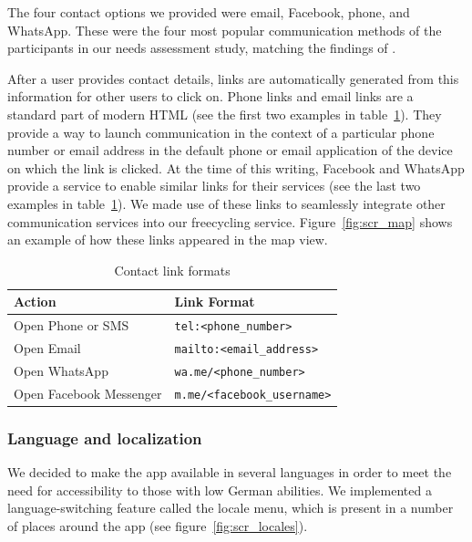 The four contact options we provided were email, Facebook, phone, and WhatsApp. These were the four most popular communication methods of the participants in our needs assessment study, matching the findings of .

After a user provides contact details, links are automatically generated from this information for other users to click on. Phone links and email links are a standard part of modern HTML (see the first two examples in table~\ref{tab:contact_link_examples}). They provide a way to launch communication in the context of a particular phone number or email address in the default phone or email application of the device on which the link is clicked. At the time of this writing, Facebook and WhatsApp provide a service to enable similar links for their services (see the last two examples in table~\ref{tab:contact_link_examples}). We made use of these links to seamlessly integrate other communication services into our freecycling service. Figure~\ref{fig:scr_map} shows an example of how these links appeared in the map view.

\begin{table}[ht]
\centering
\begin{tabular}{|l|l|}
\hline
\rowcolor{lightgray}
\textbf{Action}         & \textbf{Link Format}                                      \\ \hline
Open Phone or SMS       & \texttt{tel:\textless{}phone\_number\textgreater{}}       \\ \hline
Open Email              & \texttt{mailto:\textless{}email\_address\textgreater{}}   \\ \hline
Open WhatsApp           & \texttt{wa.me/\textless{}phone\_number\textgreater{}}     \\ \hline
Open Facebook Messenger & \texttt{m.me/\textless{}facebook\_username\textgreater{}} \\ \hline
\end{tabular}
\caption{Contact link formats}
\label{tab:contact_link_examples}
\end{table}


\subsubsection*{Language and localization}

We decided to make the app available in several languages in order to meet the need for accessibility to those with low German abilities. We implemented a language-switching feature called the locale menu, which is present in a number of places around the app (see figure~\ref{fig:scr_locales}).

